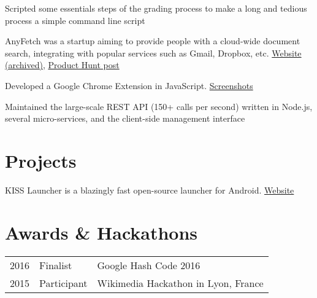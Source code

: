 \documentclass[
  english,
  letterpaper
]{resume-openfont}
\begin{document}
\begin{minipage}[t]{0.66\textwidth}
%
%
\begin{tightemize}
\vspace{\topsep}
\item Scripted some essentials steps of the grading process to make a long and tedious process a simple command line script
\end{tightemize}
\sectionsep

%
%
AnyFetch was a startup aiming to provide people with a cloud-wide document search, integrating with popular services such as Gmail, Dropbox, etc. \href{https://i.imgur.com/B3MMD6Y.png}{Website (archived)}, \href{https://www.producthunt.com/posts/anyfetch}{Product Hunt post}
\vspace{\topsep}
\begin{tightemize}
\item Developed a Google Chrome Extension in JavaScript. \href{https://i.imgur.com/yql5v1z.png}{Screenshots}
\item Maintained the large-scale REST API (150+ calls per second) written in Node.js, several micro-services, and the client-side management interface
\end{tightemize}


\section{Projects}
%
%
KISS Launcher is a blazingly fast open-source launcher for Android. \href{http://kisslauncher.com/}{Website}
\sectionsep


\section{Awards \& Hackathons}
\begin{tabular}{@{}rll}
2016       & Finalist    & Google Hash Code 2016\\
2015	     & Participant & Wikimedia Hackathon in Lyon, France
\end{tabular}
\sectionsep

\end{minipage}
\end{document}
